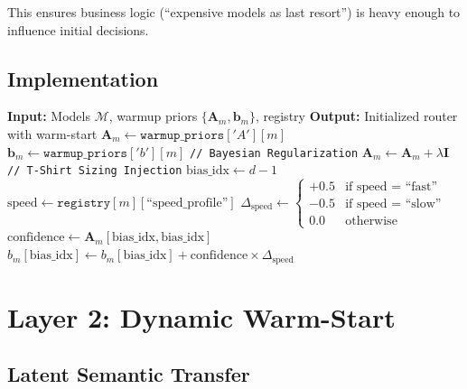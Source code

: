 \documentclass[sigconf]{acmart}
\begin{document}
This ensures business logic (``expensive models as last resort'') is heavy enough to influence initial decisions.

\subsection{Implementation}

\begin{algorithm}[h]
\caption{Layer 1: Static Warm-Start}
\label{alg:static_warmup}
\begin{algorithmic}[1]
\STATE \textbf{Input:} Models $\mathcal{M}$, warmup priors $\{\mathbf{A}_m, \mathbf{b}_m\}$, registry
\STATE \textbf{Output:} Initialized router with warm-start
\STATE
{}
    \STATE $\mathbf{A}_m \leftarrow \texttt{warmup\_priors}['A'][m]$ 
    \STATE $\mathbf{b}_m \leftarrow \texttt{warmup\_priors}['b'][m]$ 
\ENDFOR
\STATE
\STATE \texttt{// Bayesian Regularization}
    \STATE $\mathbf{A}_m \leftarrow \mathbf{A}_m + \lambda \mathbf{I}$ 
\ENDFOR
\STATE
\STATE \texttt{// T-Shirt Sizing Injection}
\STATE $\text{bias\_idx} \leftarrow d - 1$ 
    \STATE $\text{speed} \leftarrow \texttt{registry}[m][\text{``speed\_profile''}]$
    \STATE $\Delta_{\text{speed}} \leftarrow \begin{cases}
        +0.5 & \text{if speed = ``fast''} \\
        -0.5 & \text{if speed = ``slow''} \\
        0.0 & \text{otherwise}
    \end{cases}$
    \STATE $\text{confidence} \leftarrow \mathbf{A}_m[\text{bias\_idx}, \text{bias\_idx}]$
    \STATE $b_m[\text{bias\_idx}] \leftarrow b_m[\text{bias\_idx}] + \text{confidence} \times \Delta_{\text{speed}}$
\ENDFOR
\end{algorithmic}
\end{algorithm}

\section{Layer 2: Dynamic Warm-Start}
\label{sec:dynamic}

\subsection{Latent Semantic Transfer}
\end{document}
